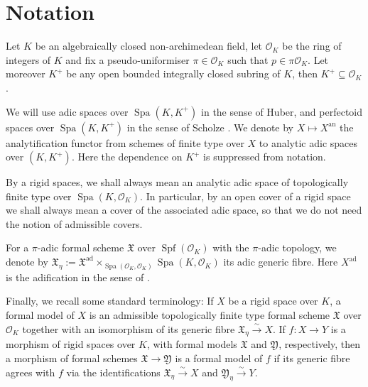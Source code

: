 \documentclass[10pt,oneside]{amsart}
\theoremstyle{definition}
\newcommand{\an}{\mathrm{an}}
\begin{document}
\section*{Notation}
	Let $K$ be an algebraically closed non-archimedean field, let $\mathcal O_K$ be the ring of integers of $K$ and fix a pseudo-uniformiser $\pi\in \mathcal O_K$ such that $p\in\pi\mathcal O_K$.  Let moreover $K^+$ be any open bounded integrally closed subring of $K$, then $K^+\subseteq \mathcal O_K$.
	
	We will use adic spaces over $\operatorname{Spa}(K,K^+)$ in the sense of Huber, and perfectoid spaces over $\operatorname{Spa}(K,K^+)$ in the sense of Scholze \cite{perfectoid}. We denote by $X\mapsto X^{\an}$ the analytification functor from schemes of finite type over $X$ to analytic adic spaces over $(K,K^+)$. Here the dependence on $K^+$ is suppressed from notation.
	
	By a rigid spaces, we shall always mean an analytic adic space of topologically finite type over $\operatorname{Spa}(K,\mathcal O_K)$. 
	In particular, by an open cover of a rigid space we shall always mean a cover of the associated adic space, so that we do not need the notion of admissible covers.
	
	For a $\pi$-adic formal scheme $\mathfrak X$ over $\operatorname{Spf}(\mathcal O_K)$ with the $\pi$-adic topology, we denote by $\mathfrak X_\eta:=\mathfrak X^{\mathrm{ad}}\times_{\operatorname{Spa}(\mathcal O_K,\mathcal O_K)}\operatorname{Spa}(K,\mathcal O_K)$ its adic generic fibre. Here $X^{\mathrm{ad}}$ is the adification in the sense of \cite{SW}.
	
	Finally, we recall some standard terminology: If $X$ be a rigid space over $K$, a formal model of $X$ is an admissible topologically finite type formal scheme $\mathfrak X$ over $\mathcal O_K$ together with an isomorphism of its generic fibre $\mathfrak X_\eta \xrightarrow{\sim} X$.
	If $f:  X\rightarrow  Y$ is a morphism of rigid spaces over $K$, with formal models $\mathfrak X$ and $\mathfrak Y$, respectively, then a morphism of formal schemes $\mathfrak X \rightarrow \mathfrak Y$ is a formal model of $f$ if its generic fibre agrees with $f$ via the identifications $\mathfrak X_\eta \xrightarrow{\sim} X$ and $\mathfrak Y_\eta \xrightarrow{\sim} Y$.


	
\end{document}
